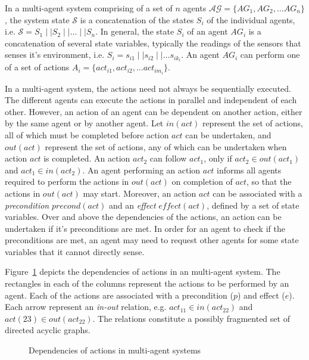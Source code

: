 In a multi-agent system comprising of a set of $n$ agents $\mathcal{AG} = \{AG_1, AG_2, \dots AG_n\}$, the system state 
$\mathcal{S}$ is a concatenation of the states $S_i$ of the individual agents, i.e. 
$\mathcal{S} = S_1 \mid \mid S_2 \mid \mid \dots \mid \mid S_n$. In general, the state $S_i$ of an agent $AG_i$ is a concatenation 
of several state variables, typically the readings of the sensors that senses it's environment, i.e. 
$S_i = s_{i1} \mid \mid s_{i2} \mid \mid \dots s_{ik_i}$.
An agent $AG_i$ can perform one of a set of actions $A_i = \{ act_{i1}, act_{i2}, \dots act_{im_i} \}$. 

In a multi-agent system, the actions need not always be sequentially executed. The different agents can execute the actions 
in parallel and independent of each other. However, an action of an agent can be dependent on another action, either by the same 
agent or by another agent. Let $in(act)$ represent the set of actions, all of which must be completed before action $act$ can 
be undertaken, and $out(act)$ represent the set of actions, any of which can be undertaken when action $act$ is completed. 
An action $act_2$ can follow $act_1$, only if $act_2 \in out(act_1)$ and $act_1 \in in(act_2)$. An agent performing an action
$act$ informs all agents required to perform the actions in $out(act)$ on completion of $act$, so that the actions in $out(act)$
may start.
%
Moreover, an action $act$ can be associated with a {\em precondition} $precond(act)$ and an {\em effect} $effect(act)$, defined 
by a set of state variables. Over and above the dependencies of the actions, an action can be undertaken if it's preconditions are met. 
In order for an agent to check if the preconditions are met, an agent may need to request other agents for some state variables 
that it cannot directly sense. 

Figure~\ref{fig:agents:mas-plan} depicts the dependencies of actions in an multi-agent system. The rectangles in each of the columns
represent the actions to be performed by an agent. Each of the actions are associated with a precondition ($p$) and effect ($e$). 
Each arrow represent an {\it in-out} relation, e.g. $act_{11} \in in(act_{22})$ and $act(23) \in out(act_{22})$. The relations
constitute a possibly fragmented set of directed acyclic graphs.

\begin{figure} [!htbp]
	\centering
	\caption{Dependencies of actions in multi-agent systems}
	\label{fig:agents:mas-plan}
\end{figure}

